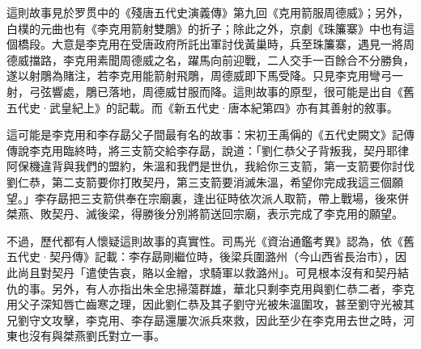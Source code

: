 這則故事見於罗贯中的《殘唐五代史演義傳》第九回《克用箭服周德威》；另外，白樸的元曲也有《李克用箭射雙鵰》的折子；除此之外，京劇《珠簾寨》中也有這個橋段。大意是李克用在受唐政府所託出軍討伐黃巢時，兵至珠簾寨，遇見一將周德威擋路，李克用素聞周德威之名，躍馬向前迎戰，二人交手一百餘合不分勝負，遂以射鵰為賭注，若李克用能箭射飛鵰，周德威即下馬受降。只見李克用彎弓一射，弓弦響處，鵰已落地，周德威甘服而降。這則故事的原型，很可能是出自《舊五代史·武皇紀上》的記載。而《新五代史·唐本紀第四》亦有其善射的敘事。

這可能是李克用和李存勗父子間最有名的故事：宋初王禹偁的《五代史闕文》記傳傳說李克用臨終時，將三支箭交給李存勗，說道：「劉仁恭父子背叛我，契丹耶律阿保機違背與我們的盟約，朱溫和我們是世仇，我給你三支箭，第一支箭要你討伐劉仁恭，第二支箭要你打敗契丹，第三支箭要消滅朱溫，希望你完成我這三個願望。」李存勗把三支箭供奉在宗廟裏，逢出征時依次派人取箭，帶上戰場，後來併桀燕、敗契丹、滅後梁，得勝後分別將箭送回宗廟，表示完成了李克用的願望。

不過，歷代都有人懷疑這則故事的真實性。司馬光《資治通鑑考異》認為，依《舊五代史·契丹傳》記載：李存勗剛繼位時，後梁兵圍潞州（今山西省長治市），因此尚且對契丹「遣使告哀，賂以金繒，求騎軍以救潞州」。可見根本沒有和契丹結仇的事。另外，有人亦指出朱全忠掃蕩群雄，華北只剩李克用與劉仁恭二者，李克用父子深知唇亡齒寒之理，因此劉仁恭及其子劉守光被朱溫圍攻，甚至劉守光被其兄劉守文攻擊，李克用、李存勗還屢次派兵來救，因此至少在李克用去世之時，河東也沒有與桀燕劉氏對立一事。







